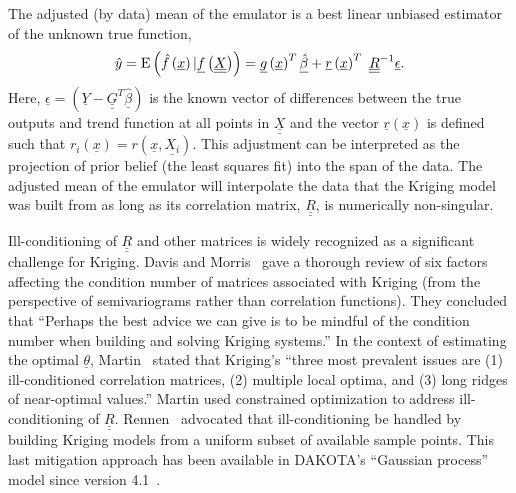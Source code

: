 \documentclass{article}
\begin{document}
The adjusted (by data) mean of the emulator is a best linear unbiased 
estimator of the unknown true function,
\begin{equation}
\hat{y}={\rm E}\left(\hat{f}\left(\underline{x}\right)|\underline{f}\left(\underline{\underline{X}}\right)\right)=\underline{g}\left(\underline{x}\right)^T\underline{\hat{\beta}}+\underline{r}\left(\underline{x}\right)^T\ \underline{\underline{R}}^{-1}\underline{\epsilon}.
\label{Eq:KrigMean}
\end{equation}
Here, $\underline{\epsilon}=\left(\underline{Y}-\underline{\underline{G}}^T\underline{\hat{\beta}}\right)$ 
is the known vector of differences between the true outputs and trend 
function at all points in $\underline{\underline{X}}$ and the vector 
$\underline{r}\left(\underline{x}\right)$ is defined such that
$r_i\left(\underline{x}\right)=r\left(\underline{x},\underline{X_i}\right)$.  
This adjustment can be interpreted as the projection of prior belief 
(the least squares fit) into the span of the data. The adjusted mean 
of the emulator will interpolate the data that the Kriging model was 
built from as long as its correlation matrix, $\underline{\underline{R}}$, 
is numerically non-singular.\newline

Ill-conditioning of $\underline{\underline{R}}$ and other matrices is
widely recognized as a significant challenge for Kriging. Davis and
Morris~\cite{davis1997six} gave a thorough review of six factors
affecting the condition number of matrices associated with Kriging
(from the perspective of semivariograms rather than correlation
functions).  They concluded that ``Perhaps the best advice we can give
is to be mindful of the condition number when building and solving
Kriging systems.''  In the context of estimating the optimal
$\underline{\theta}$, Martin~\cite{martin2009computational} stated
that Kriging's ``three most prevalent issues are (1) ill-conditioned
correlation matrices, (2) multiple local optima, and (3) long ridges
of near-optimal values.'' Martin used constrained optimization to
address ill-conditioning of $\underline{\underline{R}}$.
Rennen~\cite{rennen2009subset} advocated that ill-conditioning be
handled by building Kriging models from a uniform subset of available
sample points.  This last mitigation approach has been available in
DAKOTA's ``Gaussian process'' model since version
4.1~\cite{eldred2007dakota}.\newline
\end{document}
